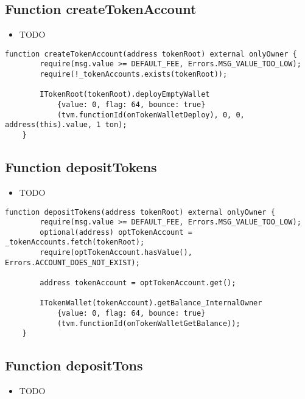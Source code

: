 \subsection{Function createTokenAccount}

\begin{itemize}
\item TODO
\end{itemize}

\begin{lstlisting}[firstnumber=228]
    function createTokenAccount(address tokenRoot) external onlyOwner {
        require(msg.value >= DEFAULT_FEE, Errors.MSG_VALUE_TOO_LOW);
        require(!_tokenAccounts.exists(tokenRoot));

        ITokenRoot(tokenRoot).deployEmptyWallet
            {value: 0, flag: 64, bounce: true}
            (tvm.functionId(onTokenWalletDeploy), 0, 0, address(this).value, 1 ton);
    }
\end{lstlisting}

\subsection{Function depositTokens}

\begin{itemize}
\item TODO
\end{itemize}

\begin{lstlisting}[firstnumber=210]
    function depositTokens(address tokenRoot) external onlyOwner {
        require(msg.value >= DEFAULT_FEE, Errors.MSG_VALUE_TOO_LOW);
        optional(address) optTokenAccount = _tokenAccounts.fetch(tokenRoot);
        require(optTokenAccount.hasValue(), Errors.ACCOUNT_DOES_NOT_EXIST);

        address tokenAccount = optTokenAccount.get();

        ITokenWallet(tokenAccount).getBalance_InternalOwner
            {value: 0, flag: 64, bounce: true}
            (tvm.functionId(onTokenWalletGetBalance));
    }
\end{lstlisting}

\subsection{Function depositTons}

\begin{itemize}
\item TODO
\end{itemize}

